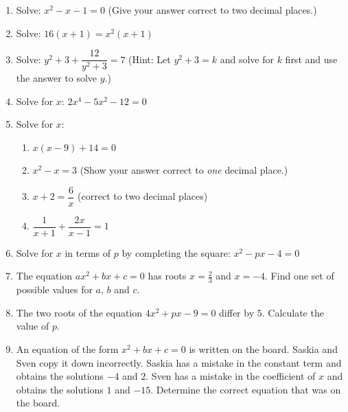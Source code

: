 \begin{eocexercises}{}
\begin{enumerate}
\item{Solve: $x^2 - x - 1 = 0$ \quad (Give your answer correct to two decimal places.)}
\item{Solve: $16(x+1) = x^2 (x+1)$}
\item{Solve: $y^2 + 3 + \dfrac{12}{y^2 + 3} = 7$ \quad
(Hint:  Let $y^2+3 = k$ and solve for $k$ first and use the answer to solve $y$.)}
\item{Solve for $x$: $2x^4 - 5x^2 - 12 = 0$}
\item{Solve for $x$:
\begin{enumerate}
\item{$x(x-9)+14 = 0$}
\item{$x^2  - x = 3$ \quad (Show your answer correct to \textit{one} decimal place.)}
\item{$x + 2 = \dfrac{6}{x}$ \quad (correct to two decimal places)}
\item{$\dfrac{1}{x+1}+\dfrac{2x}{x-1} = 1$}
\end{enumerate}}
\item{Solve for $x$ in terms of $p$ by completing the square: $x^2 - px - 4 = 0$}
\item{The equation $ax^2 + bx + c = 0$ has roots $x=\tfrac{2}{3}$ and $x=-4$. Find one set of possible values for $a$, $b$ and $c$.}

\item{The two roots of the equation $4x^2 + px - 9 = 0$ differ by $5$. Calculate the value of $p$.}

\item{ An equation of the form $x^2 + bx + c = 0$ is written
on the board. Saskia and Sven copy it down incorrectly. Saskia has
a mistake in the constant term and obtains the solutions $-4$ and $2$.
Sven has a mistake in the coefficient of $x$ and obtains the solutions
$1$ and $-15$. Determine the correct equation that was on the
board.}


\end{enumerate}
\end{eocexercises}
